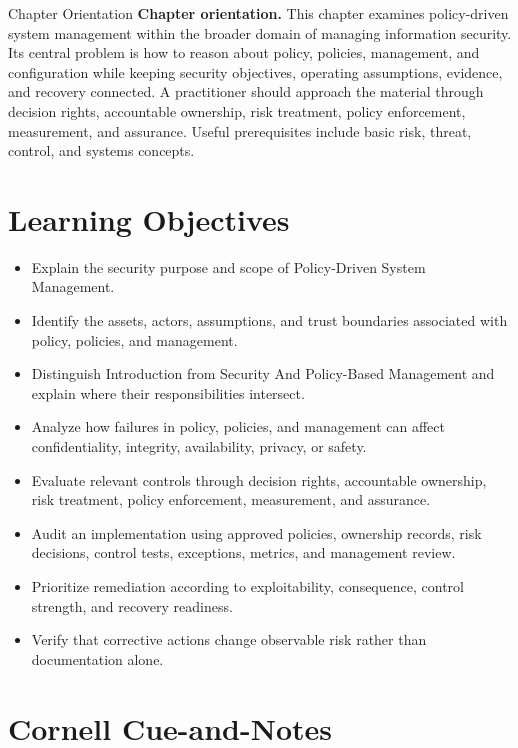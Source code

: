 \documentclass[11pt,letterpaper]{article}
\title{\CornellDocumentTitle}
\author{}
\date{}
\begin{document}
\maketitle
\begin{CornellOverviewBox}{Chapter Orientation}
\textbf{Chapter orientation.} This chapter examines policy-driven system management within the broader domain of managing information security. Its central problem is how to reason about policy, policies, management, and configuration while keeping security objectives, operating assumptions, evidence, and recovery connected. A practitioner should approach the material through decision rights, accountable ownership, risk treatment, policy enforcement, measurement, and assurance. Useful prerequisites include basic risk, threat, control, and systems concepts.
\end{CornellOverviewBox}
\section*{Learning Objectives}
\begin{itemize}
\item Explain the security purpose and scope of Policy-Driven System Management.
\item Identify the assets, actors, assumptions, and trust boundaries associated with policy, policies, and management.
\item Distinguish Introduction from Security And Policy-Based Management and explain where their responsibilities intersect.
\item Analyze how failures in policy, policies, and management can affect confidentiality, integrity, availability, privacy, or safety.
\item Evaluate relevant controls through decision rights, accountable ownership, risk treatment, policy enforcement, measurement, and assurance.
\item Audit an implementation using approved policies, ownership records, risk decisions, control tests, exceptions, metrics, and management review.
\item Prioritize remediation according to exploitability, consequence, control strength, and recovery readiness.
\item Verify that corrective actions change observable risk rather than documentation alone.
\end{itemize}
\section*{Cornell Cue-and-Notes}
\end{document}
